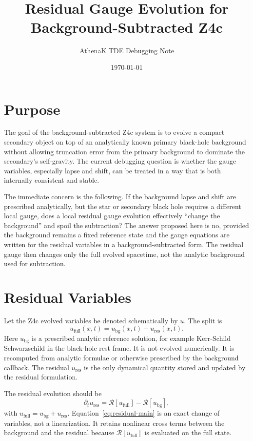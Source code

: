 \documentclass[11pt]{article}
\title{Residual Gauge Evolution for Background-Subtracted Z4c}
\author{AthenaK TDE Debugging Note}
\date{\today}
\newcommand{\ubg}{u_{\mathrm{bg}}}
\newcommand{\ures}{u_{\mathrm{res}}}
\newcommand{\ufull}{u_{\mathrm{full}}}
\newcommand{\rhs}{\mathcal{R}}
\begin{document}
\maketitle

\section{Purpose}

The goal of the background-subtracted Z4c system is to evolve a compact
secondary object on top of an analytically known primary black-hole background
without allowing truncation error from the primary background to dominate the
secondary's self-gravity.  The current debugging question is whether the
gauge variables, especially lapse and shift, can be treated in a way that is
both internally consistent and stable.

The immediate concern is the following.  If the background lapse and shift are
prescribed analytically, but the star or secondary black hole requires a
different local gauge, does a local residual gauge evolution effectively
``change the background'' and spoil the subtraction?  The answer proposed here
is no, provided the background remains a fixed reference state and the gauge
equations are written for the residual variables in a background-subtracted
form.  The residual gauge then changes only the full evolved spacetime, not
the analytic background used for subtraction.

\section{Residual Variables}

Let the Z4c evolved variables be denoted schematically by \(u\).  The split is
\begin{equation}
  \ufull(x,t) = \ubg(x,t) + \ures(x,t).
\end{equation}
Here \(\ubg\) is a prescribed analytic reference solution, for example
Kerr-Schild Schwarzschild in the black-hole rest frame.  It is not evolved
numerically.  It is recomputed from analytic formulae or otherwise prescribed
by the background callback.  The residual \(\ures\) is the only dynamical
quantity stored and updated by the residual formulation.

The residual evolution should be
\begin{equation}
  \partial_t \ures
  =
  \rhs[\ufull] - \rhs[\ubg],
  \label{eq:residual-main}
\end{equation}
with \(\ufull=\ubg+\ures\).  Equation~\eqref{eq:residual-main} is an exact
change of variables, not a linearization.  It retains nonlinear cross terms
between the background and the residual because \(\rhs[\ufull]\) is evaluated
on the full state.
\end{document}
